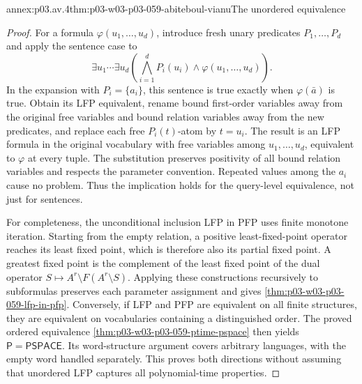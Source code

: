 \begin{annexitem}{annex:p03.av.4}{thm:p03-w03-p03-059-abiteboul-vianu}{The unordered equivalence}
\begin{proof}
For a formula \(\varphi(u_1,\ldots,u_d)\), introduce fresh
unary predicates \(P_1,\ldots,P_d\) and apply the sentence
case to
\[
 \exists u_1\cdots\exists u_d
       \left(\bigwedge_{i=1}^dP_i(u_i)\land
                                      \varphi(u_1,\ldots,u_d)\right).
\]
In the expansion with \(P_i=\{a_i\}\), this sentence is
true exactly when \(\varphi(\bar a)\) is true. Obtain its
LFP equivalent, rename bound first-order variables away from the
original free variables and bound relation variables away from the
new predicates, and replace each free \(P_i(t)\)-atom by
\(t=u_i\).
The result is an LFP formula in the original vocabulary with free
variables among \(u_1,\ldots,u_d\), equivalent to \(\varphi\)
at every tuple. The substitution preserves positivity of all bound
relation variables and respects the parameter convention. Repeated
values among the \(a_i\) cause no problem. Thus the implication
holds for the query-level equivalence, not just for sentences.

For completeness, the unconditional inclusion LFP in PFP uses
finite monotone iteration. Starting from the empty relation, a
positive least-fixed-point operator reaches its least fixed point,
which is therefore also its partial fixed point. A greatest fixed
point is the complement of the least fixed point of the dual operator
\(S\mapsto A^r\setminus F(A^r\setminus S)\). Applying these
constructions recursively to subformulas preserves each parameter
assignment and gives \cref{thm:p03-w03-p03-059-lfp-in-pfp}.
Conversely, if LFP and
PFP are equivalent on all finite structures, they are equivalent
on vocabularies containing a distinguished order. The proved ordered
equivalence \cref{thm:p03-w03-p03-059-ptime-pspace} then yields
\(\mathsf P=\mathsf{PSPACE}\). Its word-structure argument
covers arbitrary languages, with the empty word handled separately.
This proves both directions without assuming that unordered LFP
captures all polynomial-time properties.
\end{proof}
\end{annexitem}
